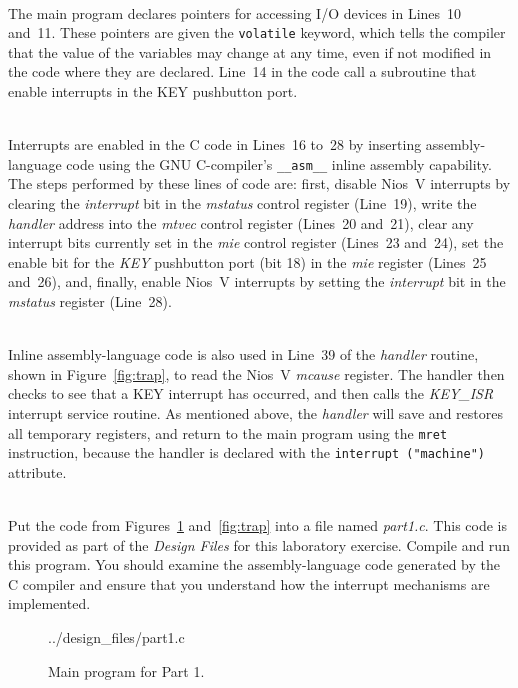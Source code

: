\documentclass[epsfig,10pt,fullpage]{article}
\begin{document}
~\\
The main program declares pointers for accessing I/O devices in Lines~10 and~11. These
pointers are given the \texttt{volatile} keyword, which tells the compiler that the
value of the variables may change at any time, even if not modified in the code where
they are declared. Line~14 in the code call a subroutine that enable interrupts in the 
KEY pushbutton port. 

~\\
Interrupts are enabled in the C code in Lines~16 to~28 by inserting assembly-language code 
using the GNU C-compiler's \texttt{\_\_asm\_\_} inline assembly capability. The steps performed by
these lines of code are: first, disable Nios~V interrupts by clearing the {\it interrupt} bit in the
{\it mstatus} control register (Line~19), write the {\it handler} address into the {\it mtvec}  
control register (Lines~20 and~21), clear any interrupt bits currently set in the {\it mie} 
control register (Lines~23 and~24), set the enable bit for the {\it KEY} pushbutton port (bit 18)
in the {\it mie} register (Lines~25 and~26), and, finally, enable Nios~V interrupts by setting the
{\it interrupt} bit in the {\it mstatus} register (Line~28).

~\\
Inline assembly-language code is also used in Line~39 of the {\it handler} routine, shown
in Figure~\ref{fig:trap}, to read the Nios~V {\it mcause} register.
The handler then checks to see that a KEY interrupt has occurred, and then calls the 
{\it KEY\_ISR} interrupt service routine. As mentioned above, the {\it handler} will save and 
restores all temporary registers, and return to the main program using the \texttt{mret} 
instruction, because the handler is declared with the \texttt{interrupt ("machine")} attribute.

~\\
Put the code from Figures~\ref{fig:code} and~\ref{fig:trap} into a file named {\it part1.c}. 
This code is provided as part of the {\it Design Files} for this laboratory exercise. 
Compile and run this program.  You should examine the assembly-language code generated by the 
C compiler and ensure that you understand how the interrupt mechanisms are implemented. 

\begin{figure}[H]
\begin{center}
\begin{minipage}[h]{14.5 cm}
 {../design_files/part1.c}
\caption{Main program for Part 1.}
\label{fig:code}
\end{minipage}
\end{center}
\end{figure}
\end{document}
